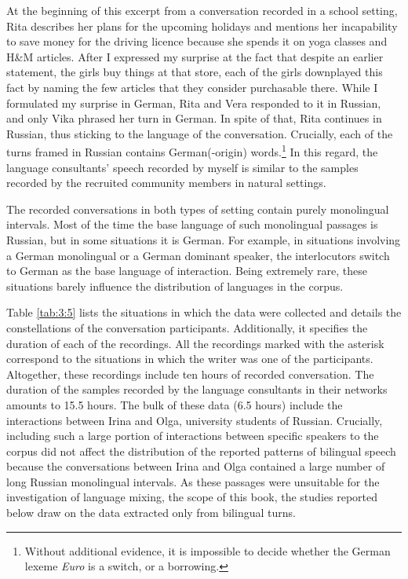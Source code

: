 \noindent At the beginning of this excerpt from a conversation recorded in a school setting, Rita describes her plans for the upcoming holidays and mentions her incapability to save  money for the driving licence because she spends it on yoga classes and H{\&}M articles. After I expressed my surprise at the fact that despite an earlier statement, the girls buy things at that store, each of the girls downplayed this fact by naming the few articles that they consider purchasable there. While I formulated my surprise in German, Rita and Vera responded to it in Russian, and only Vika phrased her turn in German. In spite of that, Rita continues in Russian, thus sticking to the language of the conversation. Crucially, each of the turns framed in Russian contains German(-origin) words.\footnote{Without additional evidence, it is impossible to decide whether the German lexeme \textit{Euro} is a switch, or a borrowing.} In this regard, the language consultants' speech recorded by myself is similar to the samples recorded by the recruited community members in natural settings.

The recorded conversations in both types of setting contain purely monolingual intervals. Most of the time the base language of such monolingual passages is Russian, but in some situations it is German. For example, in situations involving a German monolingual or a German dominant speaker, the interlocutors switch to German as the base language of interaction. Being extremely rare, these situations barely influence the distribution of languages in the corpus.

Table \ref{tab:3:5} lists the situations in which the data were collected and details the constellations of the conversation participants. Additionally, it specifies the duration of each of the recordings. All the recordings marked with the asterisk correspond to the situations in which the writer was one of the participants. Altogether, these recordings include ten hours of recorded conversation. The duration of the samples recorded by the language consultants in their networks amounts to 15.5 hours. The bulk of these data (6.5 hours) include the interactions between Irina and Olga, university students of Russian. Crucially, including such a large portion of interactions between specific speakers to the corpus did not affect the distribution of the reported patterns of bilingual speech because the conversations between Irina and Olga contained a large number of long Russian monolingual intervals. As these passages were unsuitable for the investigation of language mixing, the scope of this book, the studies reported below draw on the data extracted only from bilingual turns.

